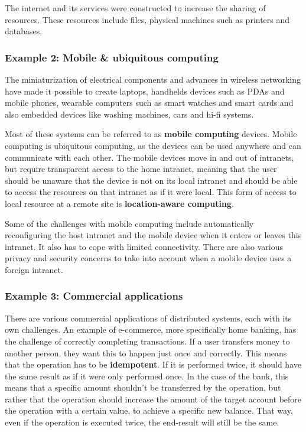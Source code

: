 \documentclass[a4paper]{article}
\begin{document}
The internet and its services were constructed to increase the sharing of resources. These resources include files, physical machines such as printers and databases.

\subsubsection{Example 2: Mobile \& ubiquitous computing}

The miniaturization of electrical components and advances in wireless networking have made it possible to create laptops, handhelds devices such as PDAs and mobile phones, wearable computers such as smart watches and smart cards and also embedded devices like washing machines, cars and hi-fi systems.

Most of these systems can be referred to as \textbf{mobile computing} devices. Mobile computing is ubiquitous computing, as the devices can be used anywhere and can communicate with each other. The mobile devices move in and out of intranets, but require transparent access to the home intranet, meaning that the user should be unaware that the device is not on its local intranet and should be able to access the resources on that intranet as if it were local. This form of access to local resource at a remote site is \textbf{location-aware computing}.

Some of the challenges with mobile computing include automatically reconfiguring the host intranet and the mobile device when it enters or leaves this intranet. It also has to cope with limited connectivity. There are also various privacy and security concerns to take into account when a mobile device uses a foreign intranet.

\subsubsection{Example 3: Commercial applications}

There are various commercial applications of distributed systems, each with its own challenges. An example of e-commerce, more specifically home banking, has the challenge of correctly completing transactions. If a user transfers money to another person, they want this to happen just once and correctly. This means that the operation has to be \textbf{idempotent}. If it is performed twice, it should have the same result as if it were only performed once. In the case of the bank, this means that a specific amount shouldn't be transferred by the operation, but rather that the operation should increase the amount of the target account before the operation with a certain value, to achieve a specific new balance. That way, even if the operation is executed twice, the end-result will still be the same.
\end{document}
